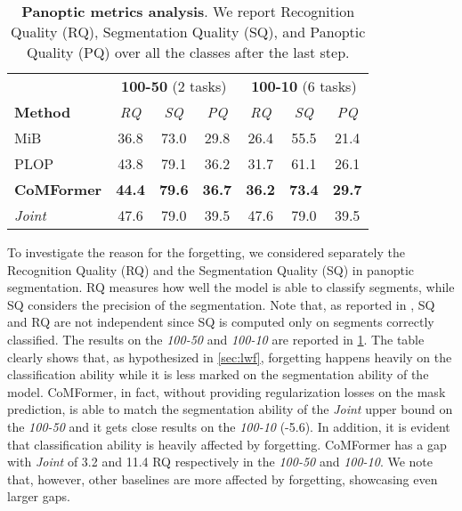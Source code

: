 \documentclass[10pt,twocolumn,letterpaper]{article}
\begin{document}
\begin{table}[t]
    \centering
    \small
    \begin{tabular}{l|ccc|ccc}
    \hline
\multicolumn{1}{c}{} & \multicolumn{3}{c}{\textbf{100-50} (2 tasks) } & \multicolumn{3}{c}{\textbf{100-10} (6 tasks)} \\
\textbf{Method}       & \textit{RQ} & \textit{SQ} & \textit{PQ} & \textit{RQ} & \textit{SQ} & \textit{PQ} \\ \hline
MiB       &  36.8 & 73.0 & 29.8 & 26.4 & 55.5 & 21.4 \\
PLOP      &  43.8 & 79.1 & 36.2 & 31.7 & 61.1 & 26.1 \\
\textbf{CoMFormer} & \textbf{44.4} & \textbf{79.6} & \textbf{36.7} & \textbf{36.2} & \textbf{73.4} & \textbf{29.7} \\ \hdashline
\textit{Joint}     &  47.6 & 79.0 & 39.5 & 47.6 & 79.0 & 39.5 \\
\hline
    \end{tabular}
    \caption{\textbf{Panoptic metrics analysis}. We report Recognition Quality (RQ), Segmentation Quality (SQ), and Panoptic Quality (PQ) over all the classes after the last step.} \vspace{-1.2em}
    \label{tab:ablation_forg}
\end{table}
  \label{sec:ablation}
To investigate the reason for the forgetting, we considered separately the Recognition Quality (RQ) and the Segmentation Quality (SQ) in panoptic segmentation. RQ measures how well the model is able to classify segments, while SQ considers the precision of the segmentation. Note that, as reported in \cite{kirillov2019panoptic}, SQ and RQ are not independent since SQ is computed only on segments correctly classified. 
The results on the \textit{100-50} and \textit{100-10} are reported in \cref{tab:ablation_forg}. The table clearly shows that, as hypothesized in \cref{sec:lwf}, forgetting happens heavily on the classification ability while it is less marked on the segmentation ability of the model. CoMFormer, in fact, without providing regularization losses on the mask prediction, is able to match the segmentation ability of the \textit{Joint} upper bound on the \textit{100-50} and it gets close results on the \textit{100-10} (-5.6). In addition, it is evident that classification ability is heavily affected by forgetting. CoMFormer has a gap with \textit{Joint} of 3.2 and 11.4 RQ respectively in the \textit{100-50} and \textit{100-10}. We note that, however, other baselines are more affected by forgetting, showcasing even larger gaps. 
\vspace{-0.3em} 
\end{document}
